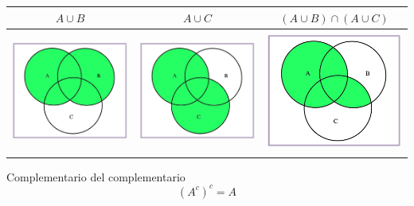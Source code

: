 \documentclass[]{book}
\begin{document}
\begin{longtable}[]{@{}ccc@{}}
\toprule
\(A\cup B\) & \(A\cup C\) & \((A\cup B)\cap (A\cup C)\)\tabularnewline
\midrule
\endhead
\includegraphics[width=\textwidth,height=4cm]{Images/proba1dibujos/distr21.jpg} & \includegraphics[width=\textwidth,height=4cm]{Images/proba1dibujos/distr22.jpg} & \includegraphics[width=\textwidth,height=4cm]{Images/proba1dibujos/distr23.jpg}\tabularnewline
\bottomrule
\end{longtable}

 Complementario del complementario
\[(A^c)^c=A\]
\end{document}
